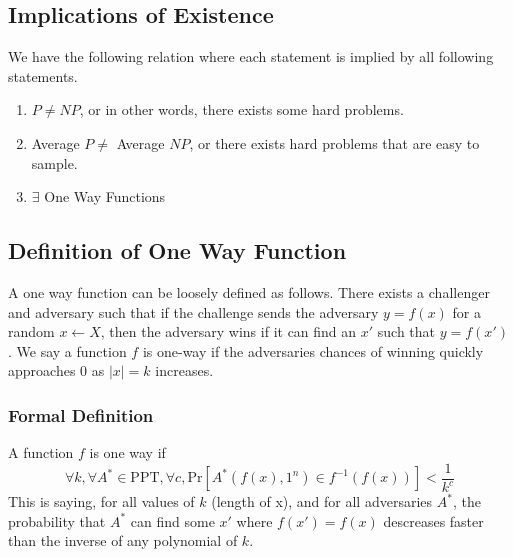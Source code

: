 \documentclass[11pt]{article}
\begin{document}
\subsection{Implications of Existence}
We have the following relation where each statement is implied by all following statements.
\begin{enumerate}
    \item $P \neq NP$, or in other words, there exists some hard problems.
    \item Average $P \neq$ Average $NP$, or there exists hard problems that are easy to sample.
    \item $\exists$ One Way Functions 
\end{enumerate}
\subsection{Definition of One Way Function}
A one way function can be loosely defined as follows. There exists a challenger and adversary such that if the challenge sends the adversary $y=f(x)$ for a random $x \leftarrow X$, then the adversary wins if it can find an $x'$ such that $y = f(x')$. We say a function $f$ is one-way if the adversaries chances of winning quickly approaches 0 as $|x| = k$ increases.

\subsubsection{Formal Definition}
A function $f$ is one way if
$$\forall k, \forall A^{*} \in \text{PPT}, \forall c, \text{Pr}[A^*(f(x),1^n) \in f^{-1}(f(x))] < \frac{1}{k^c}$$
This is saying, for all values of $k$ (length of x), and for all adversaries $A^*$, the probability that $A^*$ can find some $x'$ where $f(x') = f(x)$ descreases faster than the inverse of any polynomial of $k$.
\end{document}
